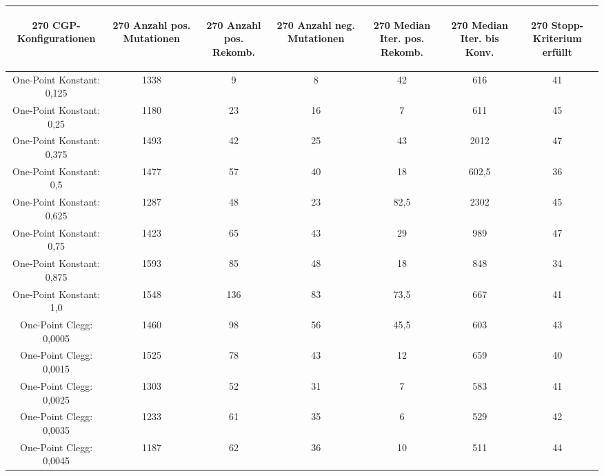 \begin{table}[H]
	\centering
	\begin{tabular}{c | c | c | c | c | c | c}
		\begin{turn}{270} \textbf{CGP-Konfigurationen} \end{turn} & \begin{turn}{270} \textbf{Anzahl pos. Mutationen} \end{turn} & \begin{turn}{270} \textbf{Anzahl pos. Rekomb.} \end{turn} & \begin{turn}{270} \textbf{Anzahl neg. Mutationen} \end{turn} & \begin{turn}{270} \textbf{Median Iter. pos. Rekomb.} \end{turn} & \begin{turn}{270} \textbf{Median Iter. bis Konv.} \end{turn} & \begin{turn}{270} \textbf{Stopp-Kriterium erfüllt} \end{turn}\\
		\hline
		One-Point Konstant: 0,125 & 1338 & 9 & 8 & 42 & 616 & 41\\
		\hline
		One-Point Konstant: 0,25 & 1180 & 23 & 16 & 7 & 611 & 45\\
		\hline
		One-Point Konstant: 0,375 & 1493 & 42 & 25 & 43 & 2012 & 47\\
		\hline
		One-Point Konstant: 0,5 & 1477 & 57 & 40 & 18 & 602,5 & 36\\
		\hline
		One-Point Konstant: 0,625 & 1287 & 48 & 23 & 82,5 & 2302 & 45\\
		\hline
		One-Point Konstant: 0,75 & 1423 & 65 & 43 & 29 & 989 & 47\\
		\hline
		One-Point Konstant: 0,875 & 1593 & 85 & 48 & 18 & 848 & 34\\
		\hline
		One-Point Konstant: 1,0 & 1548 & 136 & 83 & 73,5 & 667 & 41\\
		\hline
		One-Point Clegg: 0,0005 & 1460 & 98 & 56 & 45,5 & 603 & 43\\
		\hline
		One-Point Clegg: 0,0015 & 1525 & 78 & 43 & 12 & 659 & 40\\
		\hline
		One-Point Clegg: 0,0025 & 1303 & 52 & 31 & 7 & 583 & 41\\
		\hline
		One-Point Clegg: 0,0035 & 1233 & 61 & 35 & 6 & 529 & 42\\
		\hline
		One-Point Clegg: 0,0045 & 1187 & 62 & 36 & 10 & 511 & 44\\

\end{tabular}
\end{table}
